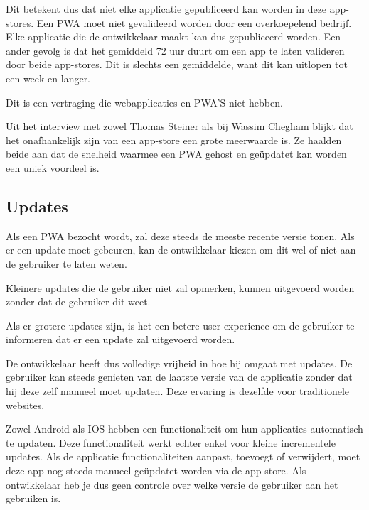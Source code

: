 	Dit betekent dus dat niet elke applicatie gepubliceerd kan worden in deze app-stores. Een PWA moet niet gevalideerd worden door een overkoepelend bedrijf. Elke applicatie die de ontwikkelaar maakt kan dus gepubliceerd worden.
	Een ander gevolg is dat het gemiddeld 72 uur duurt om een app te laten valideren door beide app-stores. Dit is slechts een gemiddelde, want dit kan uitlopen tot een week en langer.
	\autocite{Siddiqui2019}
	
	Dit is een vertraging die webapplicaties en PWA'S niet hebben.
	
	Uit het interview met zowel Thomas Steiner als bij Wassim Chegham blijkt dat het onafhankelijk zijn van een app-store een grote meerwaarde is. Ze haalden beide aan dat de snelheid waarmee een PWA gehost en geüpdatet kan worden een uniek voordeel is.
	
\subsection{Updates}

	Als een PWA bezocht wordt, zal deze steeds de meeste recente versie tonen. Als er een update moet gebeuren, kan de ontwikkelaar kiezen om dit wel of niet aan de gebruiker te laten weten. 	
	\autocite{Hume2018}
	
	Kleinere updates die de gebruiker niet zal opmerken, kunnen uitgevoerd worden zonder dat de gebruiker dit weet.
	 \autocite{Sanderson2020}
	 
	Als er grotere updates zijn, is het een betere user experience om de gebruiker te informeren dat er een update zal uitgevoerd worden.
	\autocite{Wicki2017}
	 
	De ontwikkelaar heeft dus volledige vrijheid in hoe hij omgaat met updates. De gebruiker kan steeds genieten van de laatste versie van de applicatie zonder dat hij deze zelf manueel moet updaten. Deze ervaring is dezelfde voor traditionele websites.
	
	Zowel Android als IOS hebben een functionaliteit om hun applicaties automatisch te updaten. Deze functionaliteit werkt echter enkel voor kleine incrementele updates. Als de applicatie functionaliteiten aanpast, toevoegt of verwijdert, moet deze app nog steeds manueel geüpdatet worden via de app-store. Als ontwikkelaar heb je dus geen controle over welke versie de gebruiker aan het gebruiken is.
	\autocite{Apple2020d}
	\autocite{AndroidDevelopers2020}
		

